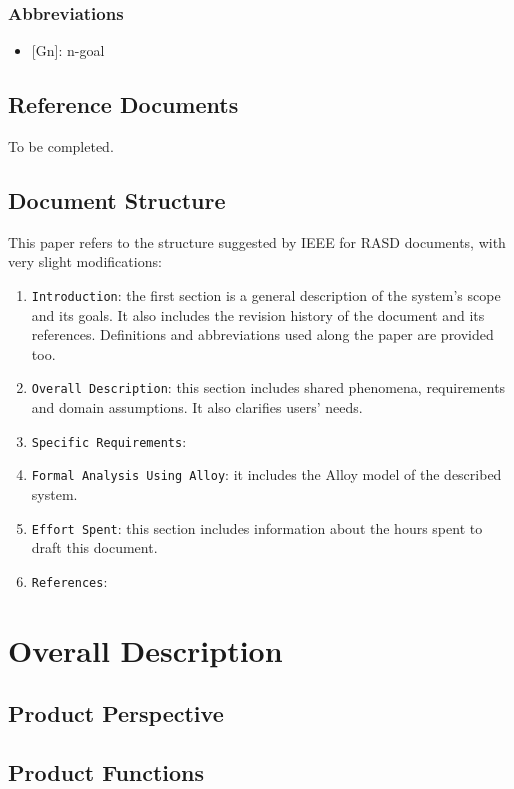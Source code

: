 \documentclass[12pt,a4paper]{article}
\begin{document}
			\subsubsection{Abbreviations}
				\begin{itemize}
				\item {[}Gn{]}: n-goal
				\end{itemize}
		
		\subsection{Reference Documents}
		To be completed.
		
		\subsection{Document Structure}
			This paper refers to the structure suggested by IEEE for RASD documents, with very slight modifications:
			\begin{enumerate}
				\item \texttt{Introduction}: the first section is a general description of the system's scope and its goals. It also includes the revision history of the document and its references. Definitions and abbreviations used along the paper are provided too.
				\item \texttt{Overall Description}: this section includes shared phenomena, requirements and domain assumptions. It also clarifies users' needs.
				\item \texttt{Specific Requirements}: 
				\item \texttt{Formal Analysis Using Alloy}: it includes the Alloy model of the described system.
				\item \texttt{Effort Spent}: this section includes information about the hours spent to draft this document. 
				\item \texttt{References}: 
			\end{enumerate}
		

	\newpage
	\section{Overall Description}
	
		\subsection{Product Perspective}
		
		\subsection{Product Functions}
		
\end{document}
